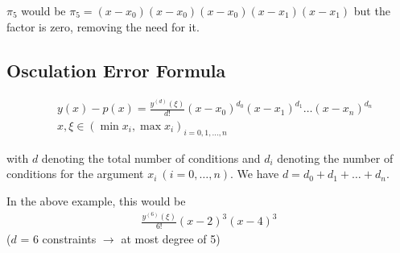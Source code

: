 $\pi_5$ would be $\pi_5 = (x-x_0)(x-x_0)(x-x_0)(x-x_1)(x-x_1)$ but the factor is zero, removing the need for it.

\subsection{Osculation Error Formula}

\begin{align*}
    \ & y(x)-p(x) = \frac{y^{(d)}(\xi)}{d!}(x-x_0)^{d_0}(x-x_1)^{d_1}\ldots(x-x_n)^{d_n} \\
    \ & x, \xi \in (\min x_i, \max x_i)_{i=0,1,\ldots,n}
\end{align*}

with $d$ denoting the total number of conditions and $d_i$ denoting the number of conditions for the argument $x_i\ (i=0,\ldots,n)$.
We have $d=d_0+d_1+\ldots+d_n$.

In the above example, this would be
\begin{align*}
    \frac{y^{(6)}(\xi)}{6!}(x-2)^3(x-4)^3
\end{align*}
($d$ = 6 constraints $\rightarrow$ at most degree of 5)
